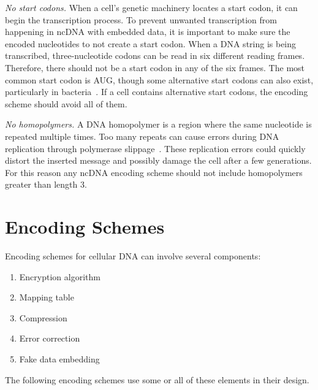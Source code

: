 \documentclass{bioinfo}
\begin{document}
\textit{No start codons.} When a cell's genetic machinery locates a start codon, it can begin the transcription process. To prevent unwanted transcription from happening in ncDNA with embedded data, it is important to make sure the encoded nucleotides to not create a start codon. When a DNA string is being transcribed, three-nucleotide codons can be read in six different reading frames. Therefore, there should not be a start codon in any of the six frames. The most common start codon is AUG, though some alternative start codons can also exist, particularly in bacteria~\cite{B1997S}. If a cell contains alternative start codons, the encoding scheme should avoid all of them.

\textit{No homopolymers.} A DNA homopolymer is a region where the same nucleotide is repeated multiple times. Too many repeats can cause errors during DNA replication through polymerase slippage~\cite{VCE2001TEJ}. These replication errors could quickly distort the inserted message and possibly damage the cell after a few generations. For this reason any ncDNA encoding scheme should not include homopolymers greater than length 3.

\section{Encoding Schemes}

Encoding schemes for cellular DNA can involve several components:

\begin{enumerate}
\item Encryption algorithm
\item Mapping table
\item Compression
\item Error correction
\item Fake data embedding
\end{enumerate}

The following encoding schemes use some or all of these elements in their design.
\end{document}
